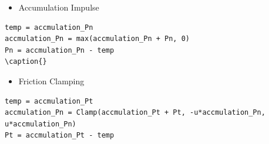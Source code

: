 \begin{itemize}
    \item{Accumulation Impulse}
\end{itemize}

\begin{lstlisting} 
temp = accmulation_Pn
accmulation_Pn = max(accmulation_Pn + Pn, 0)
Pn = accmulation_Pn - temp
\caption{}
\end{lstlisting}

\begin{itemize}
    \item{Friction Clamping}
\end{itemize}
           
\begin{lstlisting} 
temp = accmulation_Pt
accmulation_Pn = Clamp(accmulation_Pt + Pt, -u*accmulation_Pn, u*accmulation_Pn)
Pt = accmulation_Pt - temp
\end{lstlisting}

